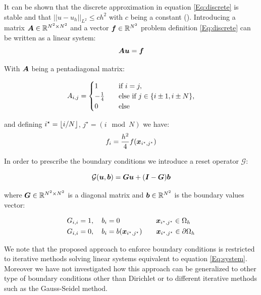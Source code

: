It can be shown that the discrete approximation in equation \ref{Eq:discrete} is stable and that $||u-u_h||_{L^2}\leq c h^2$ with $c$ being a constant (\cite{finitedif}).
Introducing a matrix ${\bm{A}} \in {\mathbb{R}}^{N^2\times N^2}$ and a vector ${\bm{f}}\in {\mathbb{R}}^{N^2}$ problem definition \ref{Eq:discrete} can be written as a linear system: 
\begin{equation}
    {\bm{A}} {\bm{u}} = {\bm{f}}
    \label{Eq:system}
\end{equation}

With ${\bm{A}}$ being a pentadiagonal matrix:

\begin{equation*}
{A}_{i, j} = 
\begin{cases}
    1       & \quad \text{if } i = j, \\
    -\frac{1}{4} & \quad \text{else if } j \in \{i \pm 1, i \pm N\}, \\
    0       & \quad \text{else}
\end{cases}    
\end{equation*}

and defining $i^{\star}=\lfloor i/N \rfloor$, $j^{\star}=(i\mod N)$ we have:
\begin{align*}
    {f}_i = \frac{h^2}{4}f({\bm{x}}_{i^{\star},j^{\star}})
\end{align*}

In order to prescribe the boundary conditions we introduce a reset operator $\mathcal{G}$:

\begin{equation*}
    \mathcal{G}({\bm{u}}, {\bm{b}}) = {\bm{G}} {\bm{u}} + ({\bm{I}}-{\bm{G}}){\bm{b}}
\end{equation*}

where ${\bm{G}} \in {\mathbb{R}}^{N^2\times N^2}$ is a diagonal matrix and ${\bm{b}} \in {\mathbb{R}}^{N^2}$ is the boundary values vector:

\begin{align*}
    {G}_{i,i} &= 1, \quad {b}_{i} = 0 \quad \; \quad \;\;\;\quad \quad {\bm{x}}_{i^{\star},j^{\star}}\in \Omega_h \\
    {G}_{i,i} &= 0, \quad {b}_{i} = b({\bm{x}}_{i^{\star},j^{\star}})  \qquad {\bm{x}}_{i^{\star},j^{\star}}\in \partial\Omega_h
\end{align*}

We note that the proposed approach to enforce boundary conditions is restricted to iterative methods solving linear systems equivalent to equation \ref{Eq:system}.
Moreover we have not investigated how this approach can be generalized to other type of boundary conditions other than Dirichlet or to different iterative methods such as the Gauss-Seidel method.

